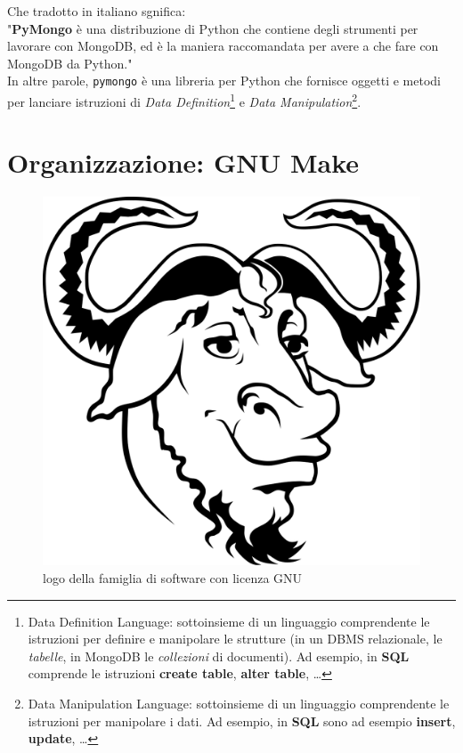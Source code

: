         Che tradotto in italiano sgnifica: \\

        "\textbf{PyMongo} è una distribuzione di Python che contiene degli strumenti per lavorare con MongoDB, ed è la maniera raccomandata per avere a che fare con MongoDB da Python." \\

        In altre parole, \texttt{pymongo} è una libreria per Python che fornisce oggetti e metodi per lanciare istruzioni di \textit{Data Definition}\footnote{Data Definition Language: sottoinsieme di un linguaggio comprendente le istruzioni per definire e manipolare le strutture (in un DBMS relazionale, le \textit{tabelle}, in MongoDB le \textit{collezioni} di documenti). Ad esempio, in \textbf{SQL} comprende le istruzioni \textbf{create table}, \textbf{alter table}, \ldots} e \textit{Data Manipulation}\footnote{Data Manipulation Language: sottoinsieme di un linguaggio comprendente le istruzioni per manipolare i dati. Ad esempio, in \textbf{SQL} sono ad esempio \textbf{insert}, \textbf{update}, \ldots}.

\section{Organizzazione: GNU Make}

    \begin{figure}
        \centering
        \caption{logo della famiglia di software con licenza GNU}
        \label{make}
        \includegraphics[scale=0.12]{img/gnu.png}
    \end{figure}

